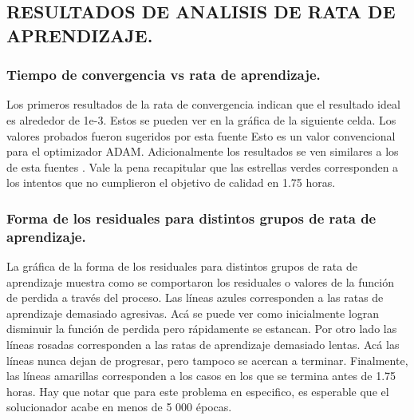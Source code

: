 \documentclass[11pt]{article}
\begin{document}
    \hypertarget{resultados-de-analisis-de-rata-de-aprendizaje.}{%
\subsection{RESULTADOS DE ANALISIS DE RATA DE
APRENDIZAJE.}\label{resultados-de-analisis-de-rata-de-aprendizaje.}}

\hypertarget{tiempo-de-convergencia-vs-rata-de-aprendizaje.}{%
\subsubsection{Tiempo de convergencia vs rata de
aprendizaje.}\label{tiempo-de-convergencia-vs-rata-de-aprendizaje.}}

Los primeros resultados de la rata de convergencia indican que el
resultado ideal es alrededor de 1e-3. Estos se pueden ver en la gráfica
de la siguiente celda. Los valores probados fueron sugeridos por esta
fuente Esto es un valor convencional para el optimizador ADAM.
Adicionalmente los resultados se ven similares a los de esta fuentes .
Vale la pena recapitular que las estrellas verdes corresponden a los
intentos que no cumplieron el objetivo de calidad en 1.75 horas.

\hypertarget{forma-de-los-residuales-para-distintos-grupos-de-rata-de-aprendizaje.}{%
\subsubsection{Forma de los residuales para distintos grupos de rata de
aprendizaje.}\label{forma-de-los-residuales-para-distintos-grupos-de-rata-de-aprendizaje.}}

La gráfica de la forma de los residuales para distintos grupos de rata
de aprendizaje muestra como se comportaron los residuales o valores de
la función de perdida a través del proceso. Las líneas azules
corresponden a las ratas de aprendizaje demasiado agresivas. Acá se
puede ver como inicialmente logran disminuir la función de perdida pero
rápidamente se estancan. Por otro lado las líneas rosadas corresponden a
las ratas de aprendizaje demasiado lentas. Acá las líneas nunca dejan de
progresar, pero tampoco se acercan a terminar. Finalmente, las líneas
amarillas corresponden a los casos en los que se termina antes de 1.75
horas. Hay que notar que para este problema en especifico, es esperable
que el solucionador acabe en menos de 5 000 épocas.
\end{document}
